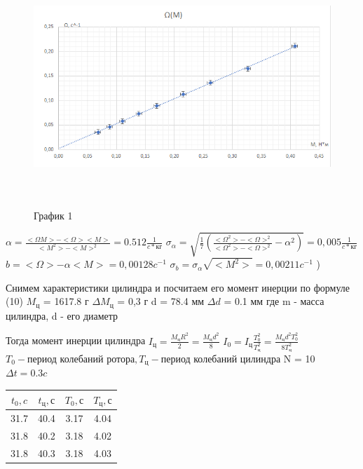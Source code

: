 \documentclass[12pt,a4paper]{article}
\begin{document}
\begin{figure}[H]
\centering
\includegraphics[width=15cm, height=9cm]{1.2.5_gr_1}
\caption{График 1}
\label{gr:1}
\end{figure}
\large$\alpha=\frac{<\Omega{M}>-<\Omega><M>}{<M^2>-<M>^2}=0.512\frac{1}{c*\text{кг}}$ \hfill \break
\large $\sigma_{\alpha}=\sqrt{\frac{1}{7}(\frac{<{\Omega}^2>-<\Omega>^2}{<{\Omega}^2>-<\Omega>^2}-{\alpha}^2)}=0,005\frac{1}{c*\text{кг}}$ \hfill \break
\large $b=<\Omega>-\alpha<M>=0,00128 c^{-1}$ \hfill \break
\large $\sigma_{b}=\sigma_{\alpha}\sqrt{<M^2>}=0,00211c^{-1}$ \hfill {})\par Снимем характеристики цилиндра и посчитаем его момент инерции по формуле (10) \hfill \break
$M_{\text{ц}}$ = 1617.8 г \;\;\;\;\;\; $\Delta{M_{\text{ц}}}$ = 0,3 г \hfill \break
d = 78.4 мм \;\;\;\;\; $\Delta{d}$ = 0.1 мм \hfill \break
где m - масса цилиндра, d - его диаметр \hfill 
\par Тогда момент инерции цилиндра $I_{\text{ц}}=\frac{M_{\text{ц}}R^2}{2}=\frac{M_{\text{ц}}d^2}{8}$ \hfill \break
$I_{0}=I_{\text{ц}}\frac{T^{2}_{0}}{T^{2}_{\text{ц}}}=\frac{M_{\text{ц}}d^2T^{2}_{0}}{8T^{2}_{\text{ц}}}$ \hfill \break
$T_{0} - \text{период колебаний ротора}, T_{\text{ц}} - \text{период колебаний цилиндра}$ \hfill \break
N = 10 \;\;\;\;\; $\Delta{t} = 0.3c$
\begin{center}
\begin{tabular}{|c|c|c|c|}
\hline 
$t_{0}, c$ & $t_{\text{ц}}, с$ & $T_{\text{0}}, с$ & $T_{\text{ц}}, с$ \\ 
\hline 
31.7 & 40.4 & 3.17 & 4.04 \\ 
\hline 
31.8 & 40.2 & 3.18 & 4.02 \\ 
\hline 
31.8 & 40.3 & 3.18 & 4.03 \\ 
\hline 
\end{tabular} 
\end{center}
\end{document}
